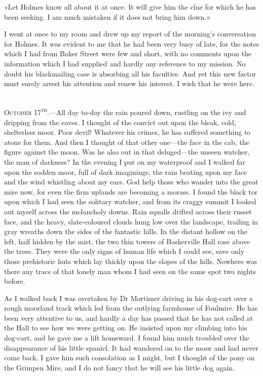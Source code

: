 »Let Holmes know all about it at once. It will give him the clue for which he has been seeking. I am much mistaken if it does not bring him down.«

I went at once to my room and drew up my report of the morning's conversation for Holmes. It was evident to me that he had been very busy of late, for the notes which I had from Baker Street were few and short, with no comments upon the information which I had supplied and hardly any reference to my mission. No doubt his blackmailing case is absorbing all his faculties. And yet this new factor must surely arrest his attention and renew his interest. I wish that he were here.

~\\

\textsc{October 17\textsuperscript{th}.}\allowbreak---\allowbreak All day to-day the rain poured down, rustling on the ivy and dripping from the eaves. I thought of the convict out upon the bleak, cold, shelterless moor. Poor devil! Whatever his crimes, he has suffered something to atone for them. And then I thought of that other one\allowbreak---\allowbreak the face in the cab, the figure against the moon. Was he also out in that deluged\allowbreak---\allowbreak the unseen watcher, the man of darkness? In the evening I put on my waterproof and I walked far upon the sodden moor, full of dark imaginings, the rain beating upon my face and the wind whistling about my ears. God help those who wander into the great mire now, for even the firm uplands are becoming a morass. I found the black tor upon which I had seen the solitary watcher, and from its craggy summit I looked out myself across the melancholy downs. Rain squalls drifted across their russet face, and the heavy, slate-coloured clouds hung low over the landscape, trailing in gray wreaths down the sides of the fantastic hills. In the distant hollow on the left, half hidden by the mist, the two thin towers of Baskerville Hall rose above the trees. They were the only signs of human life which I could see, save only those prehistoric huts which lay thickly upon the slopes of the hills. Nowhere was there any trace of that lonely man whom I had seen on the same spot two nights before.

As I walked back I was overtaken by Dr Mortimer driving in his dog-cart over a rough moorland track which led from the outlying farmhouse of Foulmire. He has been very attentive to us, and hardly a day has passed that he has not called at the Hall to see how we were getting on. He insisted upon my climbing into his dog-cart, and he gave me a lift homeward. I found him much troubled over the disappearance of his little spaniel. It had wandered on to the moor and had never come back. I gave him such consolation as I might, but I thought of the pony on the Grimpen Mire, and I do not fancy that he will see his little dog again.

